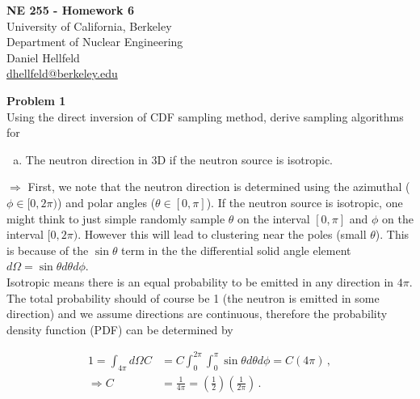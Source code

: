 \documentclass[10pt]{article}
\begin{document}
\begin{centering}
\textbf{\large NE 255 - Homework 6}\\
\vspace{10pt}
University of California, Berkeley\\
Department of Nuclear Engineering\\
\vspace{10pt}
Daniel Hellfeld\\
\href{mailto:dhellfeld@berkeley.edu}{dhellfeld@berkeley.edu}\\
\end{centering}






\vspace{20pt}
\noindent \textbf{Problem 1}\\
Using the direct inversion of CDF sampling method, derive sampling algorithms for

\begin{enumerate}[(a)]
	\item The neutron direction in 3D if the neutron source is isotropic.
\end{enumerate}

$\Rightarrow$ First, we note that the neutron direction is determined using the azimuthal ($\phi \in[0,2\pi)$) and polar angles ($\theta \in[0,\pi]$). If the neutron source is isotropic, one might think to just simple randomly sample $\theta$ on the interval $[0,\pi]$ and $\phi$ on the interval $[0,2\pi)$. However this will lead to clustering near the poles (small $\theta$). This is because of the $\sin\theta$ term in the the differential solid angle element $d\Omega = \sin\theta d\theta d\phi$.\\

Isotropic means there is an equal probability to be emitted in any direction in $4\pi$. The total probability should of course be 1 (the neutron is emitted in some direction) and we assume directions are continuous, therefore the probability density function (PDF) can be determined by

\begin{align*}
1 = \int_{4\pi} d\Omega C &= C  \int_0^{2\pi} \int_0^\pi \sin\theta d\theta d\phi = C (4\pi)\,, \\
\Rightarrow C &= \frac{1}{4\pi} = \left(\frac{1}{2}\right)\left(\frac{1}{2\pi}\right)\,.
\end{align*}
\end{document}
